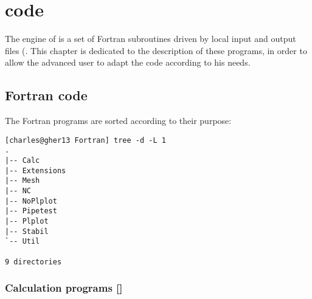 \chapter[\diva code]{\diva code}
\hypertarget{DIVACODE}{}

The engine of \diva is a set of Fortran subroutines driven by local input and output files (.
This chapter is dedicated to the description of these programs, in order to allow the advanced user to adapt the code according to his needs.

\minitoc


\section[Fortran code]{Fortran code \expert}

The Fortran programs are sorted according to their purpose: 

\begin{lstlisting}[style=Bash]
[charles@gher13 Fortran] tree -d -L 1
.
|-- Calc
|-- Extensions
|-- Mesh
|-- NC
|-- NoPlplot
|-- Pipetest
|-- Plplot
|-- Stabil
`-- Util

9 directories
\end{lstlisting}

\subsection[Calculation programs]{Calculation programs []}

